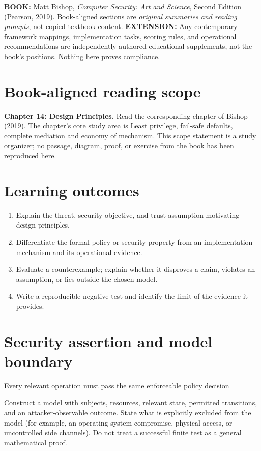 \documentclass[10pt,letterpaper]{article}
\begin{document}
\makedoctocpage
\begin{notebox}
\textbf{BOOK:} Matt Bishop, \emph{Computer Security: Art and Science}, Second Edition (Pearson, 2019). Book-aligned sections are \emph{original summaries and reading prompts}, not copied textbook content.
\textbf{EXTENSION:} Any contemporary framework mappings, implementation tasks, scoring rules, and operational recommendations are independently authored educational supplements, not the book's positions. Nothing here proves compliance.
\end{notebox}
\section{Book-aligned reading scope}
\textbf{Chapter 14: Design Principles.} Read the corresponding chapter of Bishop (2019). The chapter's core study area is Least privilege, fail-safe defaults, complete mediation and economy of mechanism. This scope statement is a study organizer; no passage, diagram, proof, or exercise from the book has been reproduced here.
\section{Learning outcomes}
\begin{enumerate}
\item Explain the threat, security objective, and trust assumption motivating design principles.
\item Differentiate the formal policy or security property from an implementation mechanism and its operational evidence.
\item Evaluate a counterexample; explain whether it disproves a claim, violates an assumption, or lies outside the chosen model.
\item Write a reproducible negative test and identify the limit of the evidence it provides.
\end{enumerate}
\section{Security assertion and model boundary}
\begin{infobox}
Every relevant operation must pass the same enforceable policy decision
\end{infobox}
Construct a model with subjects, resources, relevant state, permitted transitions, and an attacker-observable outcome. State what is explicitly excluded from the model (for example, an operating-system compromise, physical access, or uncontrolled side channels). Do not treat a successful finite test as a general mathematical proof.
\end{document}
